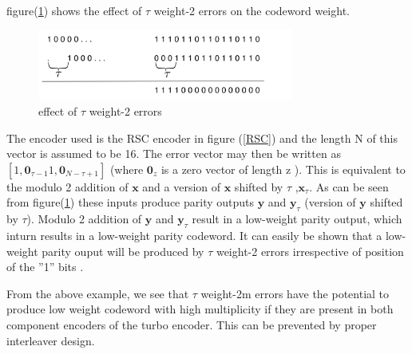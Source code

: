 \documentclass[20 pts]{article}
\begin{document}
\paragraph{}
 figure(\ref{RSC3})  shows the effect of $\tau$ weight-2 errors on the codeword weight.
 
\begin{figure}[h!]
\centering
		\includegraphics[width=0.75\textwidth]{RSCExample.pdf}
		\caption{ effect of $\tau$ weight-2 errors}
		\label{RSC3}
		\end{figure}
	
 The encoder used is the RSC encoder in figure (\ref{RSC})
  and the length N of this vector is assumed to 
be 16. The error vector may then be written as $[1, \mathbf{0}_{\tau-1} 1, \mathbf{0}_{N-\tau+1}]$
(where $\mathbf{0}_z$ is a zero vector of length z ).
This is equivalent to the modulo 2 addition of $\mathbf{x}$ and a version of
 $\mathbf{x}$ shifted by $\tau$ ,$\mathbf{x}_{\tau}$. As can be seen from 
figure(\ref{RSC3}) these inputs produce parity outputs $\mathbf{y}$ and $\mathbf{y}_{\tau}$
(version of $\mathbf{y}$ shifted by $\tau$). Modulo 2 addition of $\mathbf{y}$ and
$\mathbf{y}_{\tau}$ result in a low-weight parity output, which inturn results
in a low-weight parity codeword. It can easily be shown that a low-weight parity ouput
will be produced by $\tau$ weight-2 errors irrespective of position of the ''1'' bits . 

 From the above example, we see that $\tau$ weight-2m errors have the potential to
produce low weight codeword with high multiplicity if they are present in both 
component encoders of the turbo encoder. This can be prevented by proper interleaver
 design.
 
\end{document}
